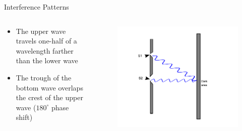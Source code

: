 \begin{frame}{Interference Patterns}
    \vspace{-1cm}
    \begin{columns}[c, onlytextwidth]
        \begin{column}{0.5\textwidth}
            \begin{itemize}
                \item The upper wave travels one-half of a wavelength farther than the lower wave
                \item The trough of the bottom wave overlaps the crest of the upper wave ($180^\circ$ phase shift)
            \end{itemize}
        \end{column}\begin{column}{0.5\textwidth}
            \begin{figure}
                \centering{}
                \includegraphics[height=1\textheight, trim={2cm  0 2cm 0},clip]{images/bright3.pdf}
            \end{figure}
        \end{column}
    \end{columns}
\end{frame}

